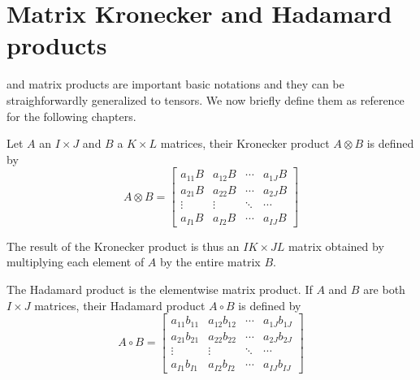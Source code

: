 \section{Matrix Kronecker and Hadamard products}
 and  matrix products are important basic notations and they can be straighforwardly generalized to tensors. We now briefly define them as reference for the following chapters.
\begin{Def}
  Let $A$ an $I \times J$ and $B$ a $K \times L$ matrices, their Kronecker product $A \otimes B$ is defined by
  \begin{equation} \label{def:kronecker}
    A \otimes B =
    \begin{bmatrix}
      a_{11}B & a_{12}B & \cdots & a_{1J}B \\
      a_{21}B & a_{22}B & \cdots & a_{2J}B \\
      \vdots & \vdots & \ddots & \cdots \\
      a_{I1}B & a_{I2}B & \cdots & a_{IJ}B
    \end{bmatrix}
  \end{equation}
\end{Def}
The result of the Kronecker product is thus an $IK \times JL$ matrix obtained by multiplying each element of $A$ by the entire matrix $B$.

\begin{Def}
  The Hadamard product is the elementwise matrix product. If $A$ and $B$ are both $I \times J$ matrices, their Hadamard product $A \circ B$ is defined by
  \begin{equation} \label{def:hadamard}
    A \circ B =
    \begin{bmatrix}
      a_{11}b_{11} & a_{12}b_{12} & \cdots & a_{1J}b_{1J} \\
      a_{21}b_{21} & a_{22}b_{22} & \cdots & a_{2J}b_{2J} \\
      \vdots & \vdots & \ddots & \cdots \\
      a_{I1}b_{I1} & a_{I2}b_{I2} & \cdots & a_{IJ}b_{IJ}
    \end{bmatrix}
  \end{equation}
\end{Def}

